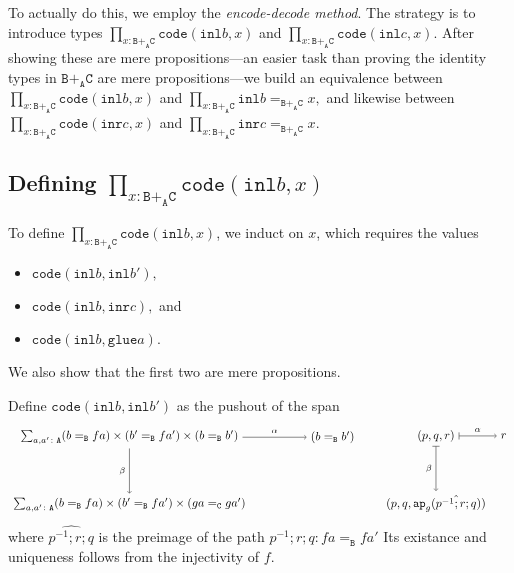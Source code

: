 \documentclass[12pt]{amsart}
\newcommand{\inv}{^{-1}}
\newcommand{\type}[1]{\mathtt{#1}}
\newcommand{\tin}{\colon}
\newcommand{\A}{\type{A}}
\newcommand{\B}{\type{B}}
\newcommand{\C}{\type{C}}
\newcommand{\BAC}{\B +_{\A} \C}
\newcommand{\ap}{\type{ap}}
\newcommand{\inl}{\type{inl}}
\newcommand{\inr}{\type{inr}}
\newcommand{\glue}{\type{glue}}
\newcommand{\code}{\type{code}}
\theoremstyle{remark}
\theoremstyle{definition}
\begin{document}
To actually do this, we employ the \textit{encode-decode method}. The
strategy is to introduce types
%
\(
   \prod\limits_{ x \tin \BAC} \code ( \inl b , x )
\)
%
and
%
\(
   \prod\limits_{ x \tin \BAC } \code ( \inl c , x ).
\)
%
After showing these are mere propositions---an easier task than
proving the identity types in \( \BAC \) are mere propositions---we build
an equivalence between
%
\(
   \prod\limits_{ x \tin \BAC } \code ( \inl b , x )
\)
%
and
%
\(
   \prod\limits_{ x \tin \BAC } \inl b =_{\BAC} x,
\)
% 
and likewise between
%
\(
   \prod\limits_{ x \tin \BAC } \code ( \inr c , x )
\)
%
and
%
\(
   \prod\limits_{ x \tin \BAC } \inr c =_{\BAC} x.
\)


\subsection{Defining \( \prod\limits_{x \tin \BAC} \code ( \inl b , x ) \)} 
\label{sec:define-code-bx}

To define \( \prod\limits_{ x \tin \BAC } \code ( \inl b , x ) \), we
induct on \( x \), which requires the values
%
\begin{itemize}
\item
  \(
      \code ( \inl b ,\inl b' ),
  \)
\item
  \(
      \code ( \inl b , \inr c ),
  \)
  and
\item
  \(
      \code ( \inl b , \glue a ).
  \)
\end{itemize}
%
We also show that the first two are mere propositions.  

Define
\(
    \code ( \inl b , \inl b' )
\)
as the pushout of the span
%
\[
\begin{tikzpicture}
	\node (1) at (0,2) 
		{ $ \sum_{ a , a' \tin \A } 
			( b =_\B fa ) 
			\times ( b' =_\B fa' ) 
			\times ( b =_\B b' ) $ };
	\node (2) at (6,2) 
		{ $ ( b =_\B b' ) $ };
	\node (3) at (0,0) 
		{ $ \sum_{ a , a' \tin \A } 
			( b =_\B fa ) 
			\times  (b' =_\B fa') 
			\times ( ga =_\C ga' ) $ };
	\draw [ -> ] (1) to 
		node [above] {\scriptsize $ \alpha $} 
		(2);
	\draw [ -> ] (1) to 
		node [left] {\scriptsize $ \beta $}
		(3);
\end{tikzpicture}
\quad \quad 
\begin{tikzpicture}
	\node (1) at (0,2) { \( ( p,q,r )  \) };
	\node (2) at (2,2) { \( r \) };
	\node (3) at (0,0) { \( ( p,q, \ap_g (\hat{p\inv ; r ; q})) \)};
        \draw [ |-> ]
          (1) to 
	  node [above] {\scriptsize $ \alpha $} 
	  (2);
        \draw [ |-> ]
          (1) to 
	  node [left] {\scriptsize $ \beta $}
	  (3);
\end{tikzpicture}
\]
%
where
\(
    \hat{p\inv ; r ; q}
\)
is the preimage of the path
%
\(
    p\inv ; r ; q \tin
    fa =_{\B} fa'
\)
% 
Its existance and uniqueness follows from
the injectivity of \( f \).
\par
\end{document}
